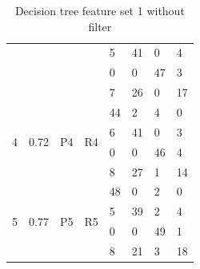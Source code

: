 \documentclass[USenglish]{ifimaster}  %
\begin{document}
\begin{table}[h]
{\begin{tabular}{@{}llllllll@{}}
\multicolumn{1}{l|}{} & \multicolumn{1}{l|}{} & \multicolumn{1}{l|}{} & \multicolumn{1}{l|}{} & \multicolumn{1}{l|}{5} & \multicolumn{1}{l|}{41} & \multicolumn{1}{l|}{0} & 4 \\ \cmidrule(l){5-8} 
\multicolumn{1}{l|}{} & \multicolumn{1}{l|}{} & \multicolumn{1}{l|}{} & \multicolumn{1}{l|}{} & \multicolumn{1}{l|}{0} & \multicolumn{1}{l|}{0} & \multicolumn{1}{l|}{47} & 3 \\ \cmidrule(l){5-8} 
\multicolumn{1}{l|}{} & \multicolumn{1}{l|}{} & \multicolumn{1}{l|}{} & \multicolumn{1}{l|}{} & \multicolumn{1}{l|}{7} & \multicolumn{1}{l|}{26} & \multicolumn{1}{l|}{0} & 17 \\ \midrule
\multicolumn{1}{l|}{\multirow{4}{*}{4}} & \multicolumn{1}{l|}{\multirow{4}{*}{0.72}} & \multicolumn{1}{l|}{\multirow{4}{*}{P4}} & \multicolumn{1}{l|}{\multirow{4}{*}{R4}} & \multicolumn{1}{l|}{44} & \multicolumn{1}{l|}{2} & \multicolumn{1}{l|}{4} & 0 \\ \cmidrule(l){5-8} 
\multicolumn{1}{l|}{} & \multicolumn{1}{l|}{} & \multicolumn{1}{l|}{} & \multicolumn{1}{l|}{} & \multicolumn{1}{l|}{6} & \multicolumn{1}{l|}{41} & \multicolumn{1}{l|}{0} & 3 \\ \cmidrule(l){5-8} 
\multicolumn{1}{l|}{} & \multicolumn{1}{l|}{} & \multicolumn{1}{l|}{} & \multicolumn{1}{l|}{} & \multicolumn{1}{l|}{0} & \multicolumn{1}{l|}{0} & \multicolumn{1}{l|}{46} & 4 \\ \cmidrule(l){5-8} 
\multicolumn{1}{l|}{} & \multicolumn{1}{l|}{} & \multicolumn{1}{l|}{} & \multicolumn{1}{l|}{} & \multicolumn{1}{l|}{8} & \multicolumn{1}{l|}{27} & \multicolumn{1}{l|}{1} & 14 \\ \midrule
\multicolumn{1}{l|}{\multirow{4}{*}{5}} & \multicolumn{1}{l|}{\multirow{4}{*}{0.77}} & \multicolumn{1}{l|}{\multirow{4}{*}{P5}} & \multicolumn{1}{l|}{\multirow{4}{*}{R5}} & \multicolumn{1}{l|}{48} & \multicolumn{1}{l|}{0} & \multicolumn{1}{l|}{2} & 0 \\ \cmidrule(l){5-8} 
\multicolumn{1}{l|}{} & \multicolumn{1}{l|}{} & \multicolumn{1}{l|}{} & \multicolumn{1}{l|}{} & \multicolumn{1}{l|}{5} & \multicolumn{1}{l|}{39} & \multicolumn{1}{l|}{2} & 4 \\ \cmidrule(l){5-8} 
\multicolumn{1}{l|}{} & \multicolumn{1}{l|}{} & \multicolumn{1}{l|}{} & \multicolumn{1}{l|}{} & \multicolumn{1}{l|}{0} & \multicolumn{1}{l|}{0} & \multicolumn{1}{l|}{49} & 1 \\ \cmidrule(l){5-8} 
\multicolumn{1}{l|}{} & \multicolumn{1}{l|}{} & \multicolumn{1}{l|}{} & \multicolumn{1}{l|}{} & \multicolumn{1}{l|}{8} & \multicolumn{1}{l|}{21} & \multicolumn{1}{l|}{3} & 18 \\ \bottomrule
\end{tabular}%
}
\caption{Decision tree feature set 1 without filter}
\label{dt3}
\end{table}
\FloatBarrier
\end{document}
